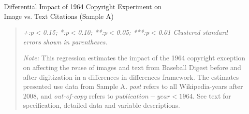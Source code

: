 
\begin{center}
\begin{table}[!htbp]
\caption{Differential Impact of 1964 Copyright Experiment on \\ Image vs. Text Citations (Sample A)}
\vspace{5mm}
%
%

%


\begin{quote}
\vspace{5mm}

\emph{+:p$<$0.15; *:p$<$0.10; **:p$<$0.05; ***:p$<$0.01 
\newline
Clustered standard errors shown in parentheses.}

\vspace{5mm}

\emph{Note:} This regression estimates the impact of the 1964 copyright exception on affecting the reuse of images and text from Baseball Digest before and after digitization in a differences-in-differences framework. The estimates presented use data from Sample A. \emph{post} refers to all Wikipedia-years after 2008, and \emph{out-of-copy} refers to $publication-year < 1964$. See text for specification, detailed data and variable descriptions.
\end{quote}
\label{tab:imgdd}
\end{table}
\end{center}










